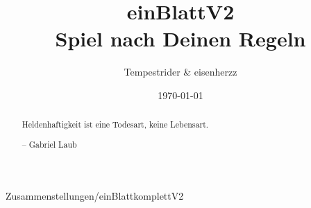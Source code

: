 \documentclass[11pt,a4paper]{scrreprt}
\date{\today}
\author{Tempestrider \& eisenherzz}
\title{\pik \karo einBlattV2\herz \kreuz \\
Spiel nach Deinen Regeln}
\begin{document}
\maketitle

\begin{abstract}
Heldenhaftigkeit ist eine Todesart, keine Lebensart.

-- Gabriel Laub

\end{abstract}




\tableofcontents

 {Zusammenstellungen/einBlattkomplettV2}

\listoftables


\end{document}
